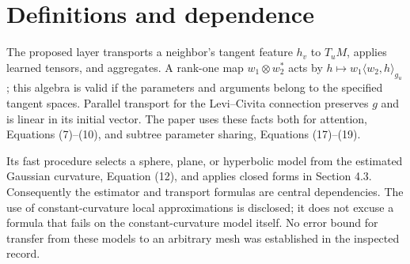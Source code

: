 \documentclass[10pt]{article}
\begin{document}
\section*{Definitions and dependence}
The proposed layer transports a neighbor’s tangent feature \(h_v\) to \(T_uM\), applies learned tensors, and aggregates. A rank-one map \(w_1\otimes w_2^*\) acts by \(h\mapsto w_1\langle w_2,h\rangle_{g_u}\); this algebra is valid if the parameters and arguments belong to the specified tangent spaces. Parallel transport for the Levi–Civita connection preserves \(g\) and is linear in its initial vector. The paper uses these facts both for attention, Equations (7)–(10), and subtree parameter sharing, Equations (17)–(19).\par
Its fast procedure selects a sphere, plane, or hyperbolic model from the estimated Gaussian curvature, Equation (12), and applies closed forms in Section 4.3. Consequently the estimator and transport formulas are central dependencies. The use of constant-curvature local approximations is disclosed; it does not excuse a formula that fails on the constant-curvature model itself. No error bound for transfer from these models to an arbitrary mesh was established in the inspected record.\par
\end{document}
